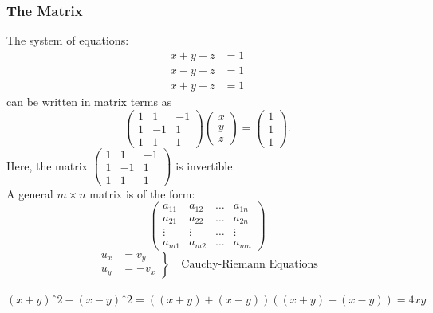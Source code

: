 \documentclass{article}
\theoremstyle{definition}
\theoremstyle{remark}
\theoremstyle{plain}
\numberwithin{equation}{subsection}
\begin{document}
{\subsubsection{The Matrix}
The system of equations:
\begin{align}
x+y-z & = 1\\
x-y+z & = 1\\
x+y+z & = 1
\end{align}
can be written in matrix terms as
\begin{equation}
\begin{pmatrix}
1 & 1 & -1\\
1 & -1 & 1\\
1 & 1 & 1
\end{pmatrix}
\begin{pmatrix}
x\\
y\\
z
\end{pmatrix}
=
\begin{pmatrix}
1\\
1\\
1
\end{pmatrix}.
\end{equation}
Here, the matrix
$\begin{pmatrix}
1 & 1 & -1\\
1 & -1 & 1\\
1 & 1 & 1
\end{pmatrix}$
is invertible.\\
A general $m\times n$ matrix is of the form:
\begin{equation}
\begin{pmatrix}
a_{11} & a_{12} & \dots & a_{1n}\\
a_{21} & a_{22} & \dots & a_{2n}\\
\vdots & \vdots & \dots & \vdots \\
a_{m1} & a_{m2} & \dots & a_{mn}
\end{pmatrix}
\end{equation}
\begin{equation*}
\left.
\begin{aligned}
u_x & = v_y\\
u_y & = -v_x
\end{aligned}
\right\}
\quad\text{Cauchy-Riemann Equations}
\end{equation*}\\
\begin{equation}
(x+y)ˆ2-(x-y)ˆ2=\left((x+y)+(x-y)\right)\left((x+y)-(x-y)\right)=4xy
\end{equation}\\

}
\end{document}
